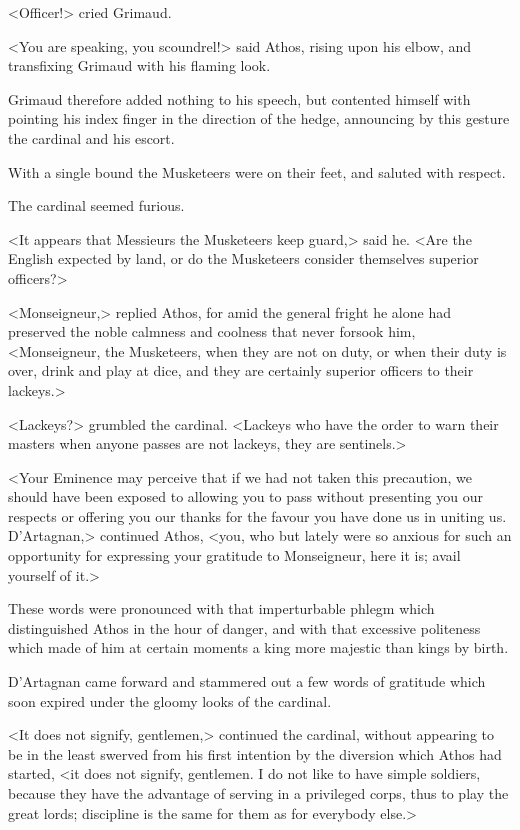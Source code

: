 <Officer!> cried Grimaud. 

<You are speaking, you scoundrel!> said Athos, rising upon his elbow, and transfixing Grimaud with his flaming look. 

Grimaud therefore added nothing to his speech, but contented himself with pointing his index finger in the direction of the hedge, announcing by this gesture the cardinal and his escort. 

With a single bound the Musketeers were on their feet, and saluted with respect. 

The cardinal seemed furious. 

<It appears that Messieurs the Musketeers keep guard,> said he. <Are the English expected by land, or do the Musketeers consider themselves superior officers?> 

<Monseigneur,> replied Athos, for amid the general fright he alone had preserved the noble calmness and coolness that never forsook him, <Monseigneur, the Musketeers, when they are not on duty, or when their duty is over, drink and play at dice, and they are certainly superior officers to their lackeys.> 

<Lackeys?> grumbled the cardinal. <Lackeys who have the order to warn their masters when anyone passes are not lackeys, they are sentinels.> 

<Your Eminence may perceive that if we had not taken this precaution, we should have been exposed to allowing you to pass without presenting you our respects or offering you our thanks for the favour you have done us in uniting us. D'Artagnan,> continued Athos, <you, who but lately were so anxious for such an opportunity for expressing your gratitude to Monseigneur, here it is; avail yourself of it.> 

These words were pronounced with that imperturbable phlegm which distinguished Athos in the hour of danger, and with that excessive politeness which made of him at certain moments a king more majestic than kings by birth. 

D'Artagnan came forward and stammered out a few words of gratitude which soon expired under the gloomy looks of the cardinal. 

<It does not signify, gentlemen,> continued the cardinal, without appearing to be in the least swerved from his first intention by the diversion which Athos had started, <it does not signify, gentlemen. I do not like to have simple soldiers, because they have the advantage of serving in a privileged corps, thus to play the great lords; discipline is the same for them as for everybody else.> 

